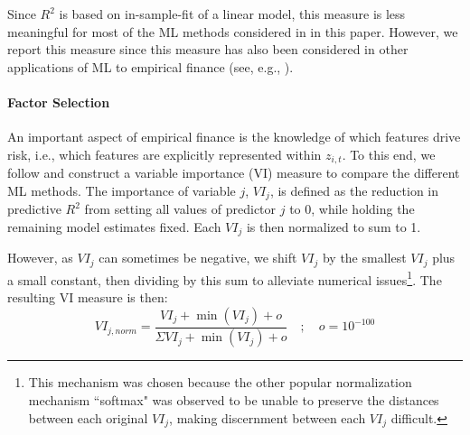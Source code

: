 \documentclass{article}
\begin{document}
Since $R^2$ is based on in-sample-fit of a linear model, this measure is less meaningful for most of the ML methods considered in in this paper. However, we report this measure since this measure has also been considered in other applications of ML to empirical finance (see, e.g., \cite{gu_empirical_2018}). 
\paragraph{Factor Selection}
An important aspect of empirical finance is the knowledge of which features drive risk, i.e., which features are explicitly represented within $z_{i,t}$. To this end, we follow \cite{gu_empirical_2018}  and construct a variable importance (VI) measure to compare the different ML methods. The importance of variable $j$, $VI_j$, is defined as the reduction in predictive $R^2$ from setting all values of predictor $j$ to 0, while holding the remaining model estimates fixed. Each $VI_j$ is then normalized to sum to 1. 

However, as $VI_j$ can sometimes be negative, we shift $VI_j$ by the smallest $VI_j$ plus a small constant, then dividing by this sum to alleviate numerical issues\footnote{This mechanism was chosen because the other popular normalization mechanism ``softmax" was observed to be unable to preserve the distances between each original $VI_j$, making discernment between each $VI_j$ difficult.}. The resulting VI measure is then:
\begin{equation}
VI_{j, norm} = \frac{VI_j + \operatorname{min}(VI_j) + o}
{\Sigma VI_j + \operatorname{min}(VI_j) + o} \quad ; \quad o = 10^{-100}
\end{equation}

\end{document}
